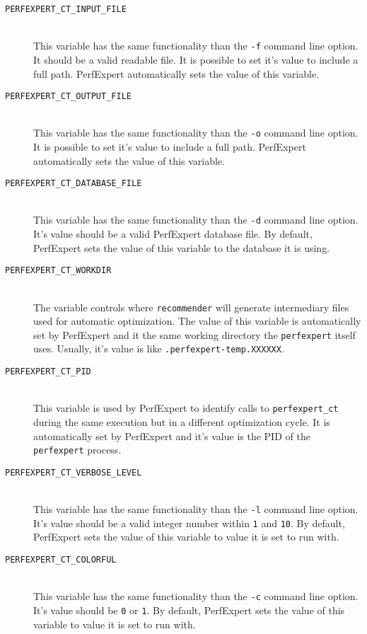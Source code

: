 \begin{description}
	\item[\texttt{PERFEXPERT\_CT\_INPUT\_FILE}]\hfill \\
	This variable has the same functionality than the \texttt{-f} command line option. It should be a valid readable file. It is possible to set it's value to include a full path. PerfExpert automatically sets the value of this variable.

	\item[\texttt{PERFEXPERT\_CT\_OUTPUT\_FILE}]\hfill \\
	This variable has the same functionality than the \texttt{-o} command line option.  It is possible to set it's value to include a full path. PerfExpert automatically sets the value of this variable.

	\item[\texttt{PERFEXPERT\_CT\_DATABASE\_FILE}]\hfill \\
	This variable has the same functionality than the \texttt{-d} command line option. It's value should be a valid PerfExpert database file. By default, PerfExpert sets the value of this variable to the database it is using.

	\item[\texttt{PERFEXPERT\_CT\_WORKDIR}]\hfill \\
	The variable controls where \texttt{recommender} will generate intermediary files used for automatic optimization. The value of this variable is automatically set by PerfExpert and it the same working directory the \texttt{perfexpert} itself uses. Usually, it's value is like \texttt{.perfexpert-temp.XXXXXX}.

	\item[\texttt{PERFEXPERT\_CT\_PID}]\hfill \\
	This variable is used by PerfExpert to identify calls to \texttt{perfexpert\_ct} during the same execution but in a different optimization cycle. It is automatically set by PerfExpert and it's value is the PID of the \texttt{perfexpert} process.

	\item[\texttt{PERFEXPERT\_CT\_VERBOSE\_LEVEL}]\hfill \\
	This variable has the same functionality than the \texttt{-l} command line option. It's value should be a valid integer number within \texttt{1} and \texttt{10}. By default, PerfExpert sets the value of this variable to value it is set to run with.

	\item[\texttt{PERFEXPERT\_CT\_COLORFUL}]\hfill \\
	This variable has the same functionality than the \texttt{-c} command line option. It's value should be \texttt{0} or \texttt{1}. By default, PerfExpert sets the value of this variable to value it is set to run with.
\end{description}

